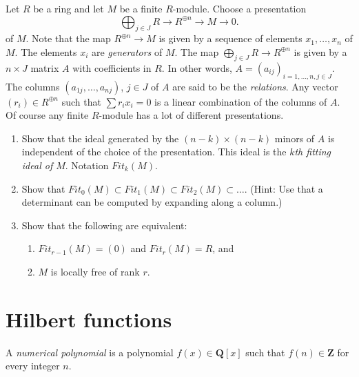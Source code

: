 \begin{exercise}
\label{exercise-fitting}
Let $R$ be a ring and let $M$ be a finite $R$-module.
Choose a presentation
$$
\bigoplus\nolimits_{j \in J} R \longrightarrow R^{\oplus n}
\longrightarrow M \longrightarrow 0.
$$
of $M$. Note that the map $R^{\oplus n} \to M$ is given by a sequence
of elements $x_1, \ldots, x_n$ of $M$. The elements $x_i$
are {\it generators} of $M$. The map $\bigoplus_{j \in J} R \to R^{\oplus n}$
is given by a $n \times J$ matrix $A$ with coefficients in $R$.
In other words, $A = (a_{ij})_{i = 1, \ldots, n, j \in J}$.
The columns $(a_{1j}, \ldots, a_{nj})$, $j \in J$ of $A$
are said to be the {\it relations}. Any vector $(r_i) \in R^{\oplus n}$
such that $\sum r_i x_i = 0$ is a linear combination of the columns of $A$.
Of course any finite $R$-module has a lot of different presentations.
\begin{enumerate}
\item Show that the ideal generated by the $(n - k) \times (n - k)$ minors of
$A$ is independent of the choice of the presentation.
This ideal is the {\it $k$th fitting ideal of $M$}. Notation $Fit_k(M)$.
\item Show that
$Fit_0(M) \subset Fit_1(M) \subset Fit_2(M) \subset \ldots$.
(Hint: Use that a determinant can be computed by expanding along a column.)
\item Show that the following are equivalent:
\begin{enumerate}
\item $Fit_{r - 1}(M) = (0)$ and $Fit_r(M) = R$, and
\item $M$ is locally free of rank $r$.
\end{enumerate}
\end{enumerate}
\end{exercise}




\section{Hilbert functions}
\label{section-hilbert}

\begin{definition}
\label{definition-numerical-polynomial}
A {\it numerical polynomial} is a polynomial $f(x) \in {\mathbf Q}[x]$
such that $f(n) \in {\mathbf Z}$ for every integer $n$.
\end{definition}

